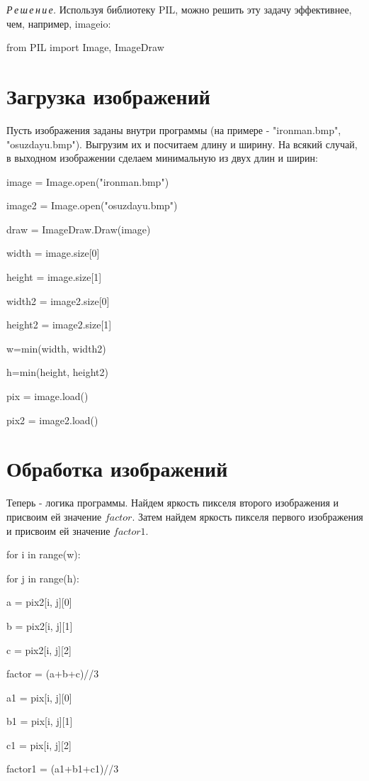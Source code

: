 \documentclass{article}
\newcommand\tab[1][1cm]{\hspace*{#1}}
\begin{document}
 
\textit{Р\,е\,ш\,е\,н\,и\,е.}  Используя библиотеку PIL, можно решить эту задачу эффективнее, чем, например, imageio:

\textsf{from PIL import Image, ImageDraw }

\section{Загрузка изображений}

Пусть изображения заданы внутри программы (на примере - "ironman.bmp", "osuzdayu.bmp"). Выгрузим их и посчитаем длину и ширину. На всякий случай, в выходном изображении сделаем минимальную из двух длин и ширин:

{

image = Image.open("ironman.bmp")
 
image2 =  Image.open("osuzdayu.bmp") 

draw = ImageDraw.Draw(image) 

width = image.size[0]  

height = image.size[1]  

width2 = image2.size[0]  

height2 = image2.size[1]  

w=min(width, width2)

h=min(height, height2)	

pix = image.load() 

pix2 = image2.load() }

\section{Обработка изображений}
 Теперь - логика программы. Найдем яркость пикселя второго изображения и присвоим ей значение $factor $. Затем найдем яркость пикселя первого изображения и присвоим ей значение $factor1 $.
 
{

for i in range(w):

\tab[1cm] for j in range(h):

\tab[2cm]		a = pix2[i, j][0] 

\tab[2cm]		b = pix2[i, j][1] 

\tab[2cm]		c = pix2[i, j][2]

\tab[2cm]		factor = (a+b+c)//3


\tab[2cm]		a1 = pix[i, j][0]  

\tab[2cm]		b1 = pix[i, j][1] 

\tab[2cm]		c1 = pix[i, j][2] 

\tab[2cm]		factor1 = (a1+b1+c1)//3
}
\end{document}

